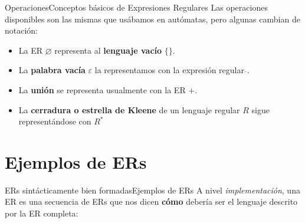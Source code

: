 \documentclass[spanish, handout]{beamer}
\begin{document}
\begin{frame}{Operaciones}{Conceptos básicos de Expresiones Regulares}
    Las operaciones disponibles son las mismas que usábamos en autómatas, pero algunas cambian de notación: \pause

    \bigskip

    \begin{itemize}
        \item La ER $\varnothing$ representa al \textbf{lenguaje vacío} $\{\}$. \pause
        \item La \textbf{palabra vacía} $\varepsilon$ la representamos con la expresión regular $\hat{}$. \pause
        \item La \textbf{unión} se representa usualmente con la ER $+$. \pause
        \item La \textbf{cerradura o estrella de Kleene} de un lenguaje regular $R$ sigue representándose con $R^*$
    \end{itemize}
\end{frame}

\section{Ejemplos de ERs}
\label{sec:ex}

\begin{frame}{ERs sintácticamente bien formadas}{Ejemplos de ERs}
    A nivel \textit{implementación}, una ER es una secuencia de ERs que nos dicen \textbf{cómo} debería ser el lenguaje descrito por la ER completa: \pause

    \bigskip

    \onslide

    \pause


    \pause

    
    \pause

\end{frame}
\end{document}
